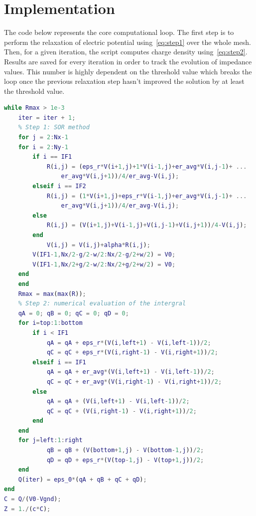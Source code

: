 \documentclass[11pt,a4paper]{article}
\begin{document}
\newpage\section{Implementation}
The code below represents the core computational loop. The first step is to perform the relaxation of electric potential using~\ref{eq:step1} over the whole mesh. Then, for a given iteration, the script computes charge density using~\ref{eq:step2}. Results are saved for every iteration in order to track the evolution of impedance values. This number is highly dependent on the threshold value which breaks the loop once the previous relaxation step hasn't improved the solution by at least the threshold value.
\begin{lstlisting}[language=Matlab]
while Rmax > 1e-3
    iter = iter + 1;
    % Step 1: SOR method
    for j = 2:Nx-1
    for i = 2:Ny-1
        if i == IF1
            R(i,j) = (eps_r*V(i+1,j)+1*V(i-1,j)+er_avg*V(i,j-1)+ ...
                er_avg*V(i,j+1))/4/er_avg-V(i,j); 
        elseif i == IF2
            R(i,j) = (1*V(i+1,j)+eps_r*V(i-1,j)+er_avg*V(i,j-1)+ ...
                er_avg*V(i,j+1))/4/er_avg-V(i,j); 
        else
            R(i,j) = (V(i+1,j)+V(i-1,j)+V(i,j-1)+V(i,j+1))/4-V(i,j);
        end
            V(i,j) = V(i,j)+alpha*R(i,j);
        V(IF1-1,Nx/2-g/2-w/2:Nx/2-g/2+w/2) = V0;
        V(IF1-1,Nx/2+g/2-w/2:Nx/2+g/2+w/2) = V0;
    end
    end
    Rmax = max(max(R));
    % Step 2: numerical evaluation of the intergral
    qA = 0; qB = 0; qC = 0; qD = 0;
    for i=top:1:bottom
        if i < IF1
            qA = qA + eps_r*(V(i,left+1) - V(i,left-1))/2;
            qC = qC + eps_r*(V(i,right-1) - V(i,right+1))/2;
        elseif i == IF1
            qA = qA + er_avg*(V(i,left+1) - V(i,left-1))/2;
            qC = qC + er_avg*(V(i,right-1) - V(i,right+1))/2;
        else
            qA = qA + (V(i,left+1) - V(i,left-1))/2;
            qC = qC + (V(i,right-1) - V(i,right+1))/2;
        end
    end
    for j=left:1:right
            qB = qB + (V(bottom+1,j) - V(bottom-1,j))/2;
            qD = qD + eps_r*(V(top-1,j) - V(top+1,j))/2;
    end
    Q(iter) = eps_0*(qA + qB + qC + qD);
end
C = Q/(V0-Vgnd);
Z = 1./(c*C);
\end{lstlisting}
\end{document}
